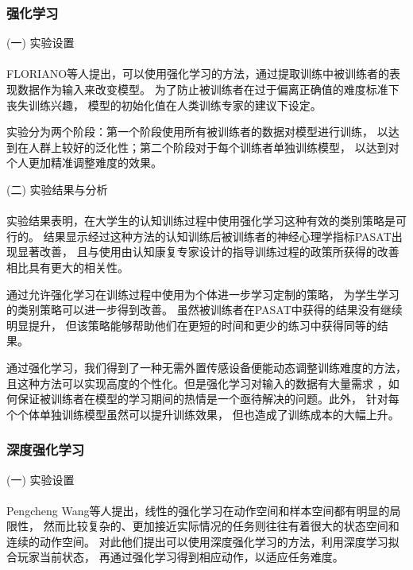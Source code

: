 \documentclass{article}
\begin{document}
            \subsubsection{强化学习}
            (一) 实验设置\paragraph{}
            FLORIANO\cite{ref2}等人提出，可以使用强化学习的方法，通过提取训练中被训练者的表现数据作为输入来改变模型。
            为了防止被训练者在过于偏离正确值的难度标准下丧失训练兴趣，
            模型的初始化值在人类训练专家的建议下设定。

            实验分为两个阶段：第一个阶段使用所有被训练者的数据对模型进行训练，
            以达到在人群上较好的泛化性；第二个阶段对于每个训练者单独训练模型，
            以达到对个人更加精准调整难度的效果。

            (二) 实验结果与分析\paragraph{}
            实验结果表明，在大学生的认知训练过程中使用强化学习这种有效的类别策略是可行的。
            结果显示经过这种方法的认知训练后被训练者的神经心理学指标PASAT出现显著改善，
            且与使用由认知康复专家设计的指导训练过程的政策所获得的改善相比具有更大的相关性。

            通过允许强化学习在训练过程中使用为个体进一步学习定制的策略，
            为学生学习的类别策略可以进一步得到改善。
            虽然被训练者在PASAT中获得的结果没有继续明显提升，
            但该策略能够帮助他们在更短的时间和更少的练习中获得同等的结果。

            通过强化学习，我们得到了一种无需外置传感设备便能动态调整训练难度的方法，
            且这种方法可以实现高度的个性化。但是强化学习对输入的数据有大量需求
            ，如何保证被训练者在模型的学习期间的热情是一个亟待解决的问题。此外，
            针对每个个体单独训练模型虽然可以提升训练效果，
            但也造成了训练成本的大幅上升。

            \subsubsection{深度强化学习}
            (一) 实验设置\paragraph{}
            Pengcheng Wang等人提出，线性的强化学习在动作空间和样本空间都有明显的局限性，
            然而比较复杂的、更加接近实际情况的任务则往往有着很大的状态空间和连续的动作空间。
            对此他们提出可以使用深度强化学习的方法，利用深度学习拟合玩家当前状态，
            再通过强化学习得到相应动作，以适应任务难度。
\end{document}
